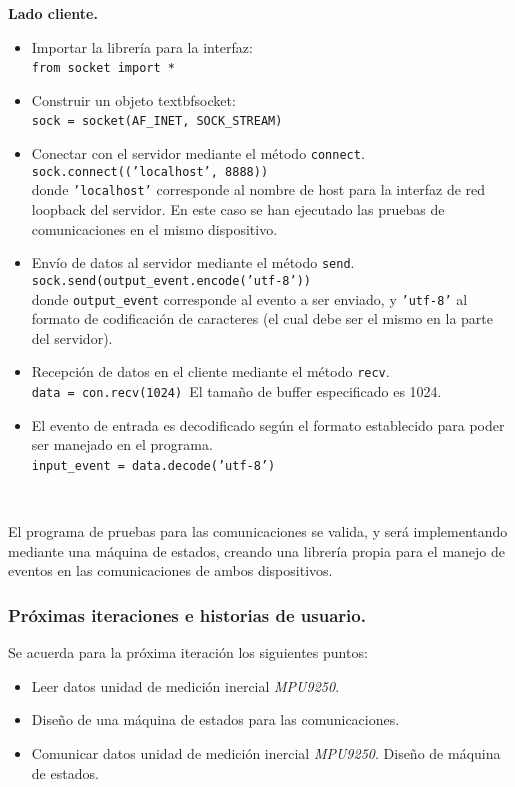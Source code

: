 \textbf{Lado cliente.}\\
\begin{itemize}
\item Importar la librería para la interfaz:\\
\texttt{from socket import *}\
\item Construir un objeto textbf{socket}:\\
\texttt{sock = socket(AF\_INET, SOCK\_STREAM)}\
\item Conectar con el servidor mediante el método \texttt{connect}.\\
\texttt{sock.connect(('localhost', 8888))}\\
donde \texttt{'localhost'} corresponde al nombre de host para la interfaz de red loopback del servidor. En este caso se han ejecutado las pruebas de comunicaciones en el mismo dispositivo.\
\item Envío de datos al servidor mediante el método \texttt{send}.\\
\texttt{sock.send(output\_event.encode('utf-8'))}\\
donde \texttt{output\_event} corresponde al evento a ser enviado, y \texttt{'utf-8'} al formato de codificación de caracteres (el cual debe ser el mismo en la parte del servidor).\
\item Recepción de datos en el cliente mediante el método \texttt{recv}.\\
\texttt{data = con.recv(1024)}\
El tamaño de buffer especificado es 1024.\
\item El evento de entrada es decodificado según el formato establecido para poder ser manejado en el programa.\\
\texttt{input\_event = data.decode('utf-8')}\
\end{itemize}\

El programa de pruebas para las comunicaciones se valida, y será implementando mediante una máquina de estados, creando una librería propia para el manejo de eventos en las comunicaciones de ambos dispositivos.

\subsubsection{Próximas iteraciones e historias de usuario.}
Se acuerda para la próxima iteración los siguientes puntos:
\begin{itemize}
\item Leer datos unidad de medición inercial \emph{MPU9250}.
\item Diseño de una máquina de estados para las comunicaciones.
\item Comunicar datos unidad de medición inercial \emph{MPU9250}. Diseño de máquina de estados.
\end{itemize}



